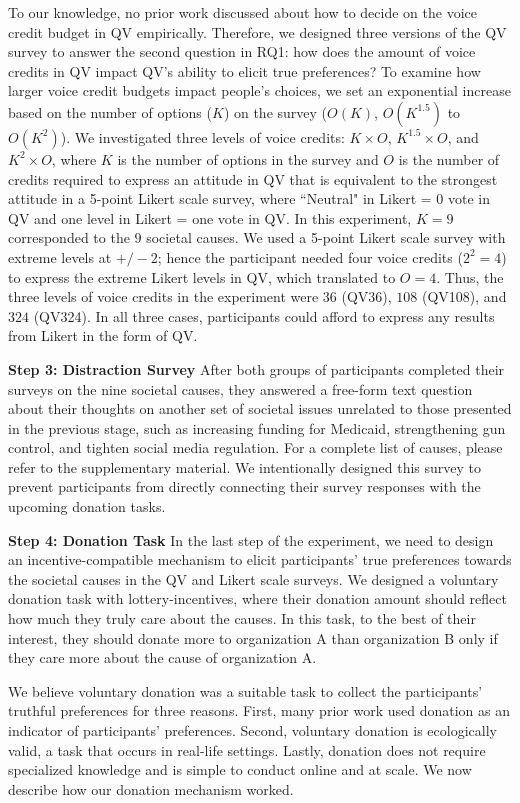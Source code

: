 To our knowledge, no prior work discussed about how to decide on the voice credit budget in QV empirically. Therefore, we designed three versions of the QV survey to answer the second question in RQ1: how does the amount of voice credits in QV impact QV's ability to elicit true preferences? To examine how larger voice credit budgets impact people's choices, we set an exponential increase based on the number of options ($K$) on the survey ($O(K)$, $O(K^{1.5})$ to $O(K^2)$). We investigated three levels of voice credits: $K \times O$, $K^{1.5} \times O$, and $K^2 \times O$, where $K$ is the number of options in the survey and $O$ is the number of credits required to express an attitude in QV that is equivalent to the strongest attitude in a 5-point Likert scale survey, where ``Neutral" in Likert = 0 vote in QV and one level in Likert = one vote in QV. In this experiment, $K=9$ corresponded to the $9$ societal causes. We used a 5-point Likert scale survey with extreme levels at $+/-2$; hence the participant needed four voice credits ($2^2=4$) to express the extreme Likert levels in QV, which translated to $O=4$. Thus, the three levels of voice credits in the experiment were $36$ (QV36), $108$ (QV108), and $324$ (QV324). In all three cases, participants could afford to express any results from Likert in the form of QV. 


\textbf{Step 3: Distraction Survey} After both groups of participants completed their surveys on the nine societal causes, they answered a free-form text question about their thoughts on another set of societal issues unrelated to those presented in the previous stage, such as increasing funding for Medicaid, strengthening gun control, and tighten social media regulation. For a complete list of causes, please refer to the supplementary material. We intentionally designed this survey to prevent participants from directly connecting their survey responses with the upcoming donation tasks. 

\textbf{Step 4: Donation Task} In the last step of the experiment, we need to design an incentive-compatible mechanism to elicit participants' true preferences towards the societal causes in the QV and Likert scale surveys. We designed a voluntary donation task with lottery-incentives, where their donation amount should reflect how much they truly care about the causes. In this task, to the best of their interest, they should donate more to organization A than organization B only if they care more about the cause of organization A. 

We believe voluntary donation was a suitable task to collect the participants' truthful preferences for three reasons. First, many prior work \cite{Xiao2019, benz2008people, gendall2010effect, hsieh2010pay, hsieh2016you} used donation as an indicator of participants' preferences. Second, voluntary donation is ecologically valid, a task that occurs in real-life settings. Lastly, donation does not require specialized knowledge and is simple to conduct online and at scale. We now describe how our donation mechanism worked.

